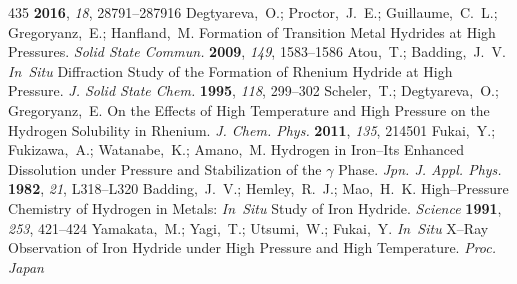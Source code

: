 \documentclass[12pt,letterpaper,oneside]{article}
\begin{document}
\begin{mcitethebibliography}{435}
  \textbf{2016}, \emph{18}, 28791--287916\relax
\mciteBstWouldAddEndPuncttrue
\mciteSetBstMidEndSepPunct{\mcitedefaultmidpunct}
{\mcitedefaultendpunct}{\mcitedefaultseppunct}\relax
\EndOfBibitem
{}
Degtyareva,~O.; Proctor,~J.~E.; Guillaume,~C.~L.; Gregoryanz,~E.; Hanfland,~M.
  Formation of Transition Metal Hydrides at High Pressures. \emph{Solid State
  Commun.} \textbf{2009}, \emph{149}, 1583--1586\relax
\mciteBstWouldAddEndPuncttrue
\mciteSetBstMidEndSepPunct{\mcitedefaultmidpunct}
{\mcitedefaultendpunct}{\mcitedefaultseppunct}\relax
\EndOfBibitem
{}
Atou,~T.; Badding,~J.~V. \emph{In~Situ} Diffraction Study of the Formation of
  Rhenium Hydride at High Pressure. \emph{J. Solid State Chem.} \textbf{1995},
  \emph{118}, 299--302\relax
\mciteBstWouldAddEndPuncttrue
\mciteSetBstMidEndSepPunct{\mcitedefaultmidpunct}
{\mcitedefaultendpunct}{\mcitedefaultseppunct}\relax
\EndOfBibitem
{}
Scheler,~T.; Degtyareva,~O.; Gregoryanz,~E. On the Effects of High Temperature
  and High Pressure on the Hydrogen Solubility in Rhenium. \emph{J. Chem.
  Phys.} \textbf{2011}, \emph{135}, 214501\relax
\mciteBstWouldAddEndPuncttrue
\mciteSetBstMidEndSepPunct{\mcitedefaultmidpunct}
{\mcitedefaultendpunct}{\mcitedefaultseppunct}\relax
\EndOfBibitem
{}
Fukai,~Y.; Fukizawa,~A.; Watanabe,~K.; Amano,~M. Hydrogen in Iron--Its Enhanced
  Dissolution under Pressure and Stabilization of the $\gamma$ Phase.
  \emph{Jpn. J. Appl. Phys.} \textbf{1982}, \emph{21}, L318--L320\relax
\mciteBstWouldAddEndPuncttrue
\mciteSetBstMidEndSepPunct{\mcitedefaultmidpunct}
{\mcitedefaultendpunct}{\mcitedefaultseppunct}\relax
\EndOfBibitem
{}
Badding,~J.~V.; Hemley,~R.~J.; Mao,~H.~K. High--Pressure Chemistry of Hydrogen
  in Metals: \emph{In~Situ} Study of Iron Hydride. \emph{Science} \textbf{1991},
  \emph{253}, 421--424\relax
\mciteBstWouldAddEndPuncttrue
\mciteSetBstMidEndSepPunct{\mcitedefaultmidpunct}
{\mcitedefaultendpunct}{\mcitedefaultseppunct}\relax
\EndOfBibitem
{}
Yamakata,~M.; Yagi,~T.; Utsumi,~W.; Fukai,~Y. \emph{In~Situ} X--Ray Observation of
  Iron Hydride under High Pressure and High Temperature. \emph{Proc. Japan
}
\end{mcitethebibliography}
\end{document}
